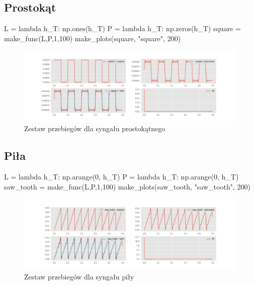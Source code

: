 \documentclass[13pt]{article}
\begin{document}
\subsection{Prostokąt}
\begin{pyverbatim}
L = lambda h_T: np.ones(h_T)
P = lambda h_T: np.zeros(h_T)
square = make_func(L,P,1,100)
make_plots(square, "square", 200)
\end{pyverbatim}
\begin{figure}[!h]
	\centering
	\includegraphics[width=\textwidth]{square.png}
	\caption{Zestaw przebiegów dla syngału prostokątnego}
\end{figure}

\subsection{Piła}
\begin{pyverbatim}
L = lambda h_T: np.arange(0, h_T)
P = lambda h_T: np.arange(0, h_T)
saw_tooth = make_func(L,P,1,100)
make_plots(saw_tooth, "saw_tooth", 200)
\end{pyverbatim}
\begin{figure}[!h]
	\centering
	\includegraphics[width=\textwidth]{saw_tooth.png}
	\caption{Zestaw przebiegów dla syngału piły}
\end{figure}
\newpage
\end{document}

